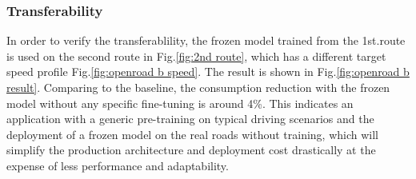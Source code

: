 \documentclass{article}
\begin{document}


\subsubsection{Transferability}\label{sec:transferable}

In order to verify the transferablility, the frozen model trained from the 1st.\@ route is used on the second route in Fig.\@\ref{fig:2nd route}, which has a different target speed profile Fig.\@\ref{fig:openroad b speed}. The result is shown in Fig.\@\ref{fig:openroad b result}. Comparing to the baseline, the consumption reduction with the frozen model without any specific fine-tuning is around 4\%. This indicates an application with a generic pre-training on typical driving scenarios and the deployment of a frozen model on the real roads without training, which will simplify the production architecture and deployment cost drastically at the expense of less performance and adaptability.
\end{document}
